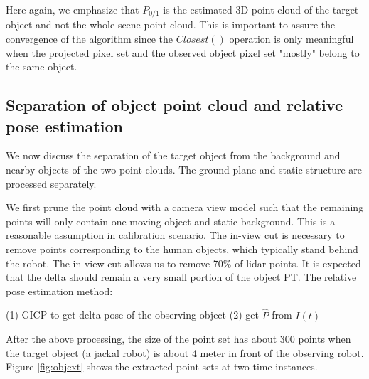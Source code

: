\documentclass{article}
\begin{document}
Here again, we emphasize that $P_{0/1}$ is the estimated 3D point cloud 
of the target object and not the whole-scene point cloud. This is important to assure the convergence of the algorithm since the $Closest()$ operation is only meaningful when the projected pixel set and the observed object pixel set "mostly" belong to the same object. 

\subsection{Separation of object point cloud and relative pose estimation}
We now discuss the separation of the target object from the background and nearby objects of the two point clouds. The ground plane and static structure are processed separately. 

We first prune the point cloud with a camera view model such that the remaining points will only contain one moving object and static background. This is a reasonable assumption in calibration scenario. The in-view cut is necessary to remove points corresponding to the human objects, which typically stand behind the robot. The in-view cut allows us to remove 70\% of lidar points.
It is expected that the delta should remain a very small portion of the object PT. 
The relative pose estimation method:

(1) GICP to get delta pose of the observing object
(2) get $\hat{P}$ from $I(t)$

After the above processing, the size of the point set has about 300 points when the target object (a jackal robot) is about 4 meter in front of the observing robot. Figure \ref{fig:objext} shows the extracted point sets at two time instances.
\end{document}
